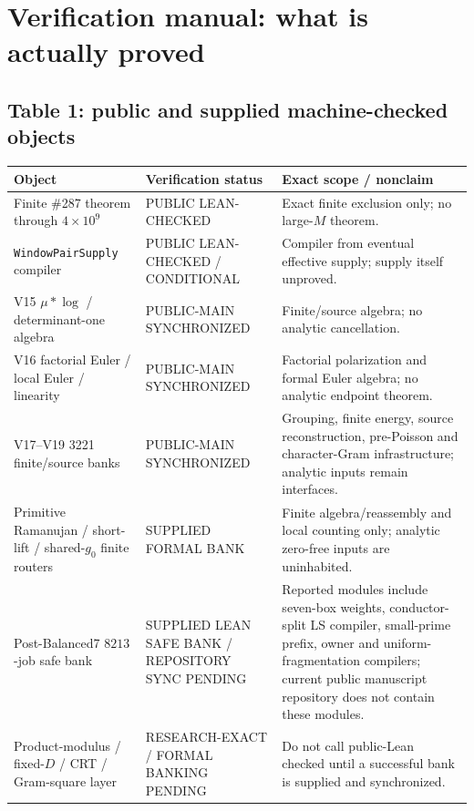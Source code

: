 \documentclass[11pt]{article}
\theoremstyle{definition}
\newcommand{\1}{\mathbf 1}
\newcommand{\status}[1]{\textsf{#1}}
\begin{document}
\section{Verification manual: what is actually proved}

\subsection{Table 1: public and supplied machine-checked objects}

\begin{center}
\scriptsize
\renewcommand{\arraystretch}{1.16}
\begin{tabularx}{\textwidth}{>{\raggedright\arraybackslash}p{}
>{\raggedright\arraybackslash}p{}X}
\toprule
Object & Verification status & Exact scope / nonclaim\\
\midrule
Finite \#287 theorem through $4\times10^9$ &
\status{PUBLIC LEAN-CHECKED} &
Exact finite exclusion only; no large-$M$ theorem.\\
\texttt{WindowPairSupply} compiler &
\status{PUBLIC LEAN-CHECKED / CONDITIONAL} &
Compiler from eventual effective supply; supply itself unproved.\\
V15 $\mu*\log$ / determinant-one algebra &
\status{PUBLIC-MAIN SYNCHRONIZED} &
Finite/source algebra; no analytic cancellation.\\
V16 factorial Euler / local Euler / linearity &
\status{PUBLIC-MAIN SYNCHRONIZED} &
Factorial polarization and formal Euler algebra; no analytic endpoint theorem.\\
V17--V19 3221 finite/source banks &
\status{PUBLIC-MAIN SYNCHRONIZED} &
Grouping, finite energy, source reconstruction, pre-Poisson and character-Gram
infrastructure; analytic inputs remain interfaces.\\
Primitive Ramanujan / short-lift / shared-$g_0$ finite routers &
\status{SUPPLIED FORMAL BANK} &
Finite algebra/reassembly and local counting only; analytic zero-free inputs are
uninhabited.\\
Post-Balanced7 $8213$-job safe bank &
\status{SUPPLIED LEAN SAFE BANK / REPOSITORY SYNC PENDING} &
Reported modules include seven-box weights, conductor-split LS compiler, small-prime prefix,
owner and uniform-fragmentation compilers; current public manuscript repository does not
contain these modules.\\
Product-modulus / fixed-$D$ / CRT / Gram-square layer &
\status{RESEARCH-EXACT / FORMAL BANKING PENDING} &
Do not call public-Lean checked until a successful bank is supplied and synchronized.\\
\bottomrule
\end{tabularx}
\end{center}
\end{document}
